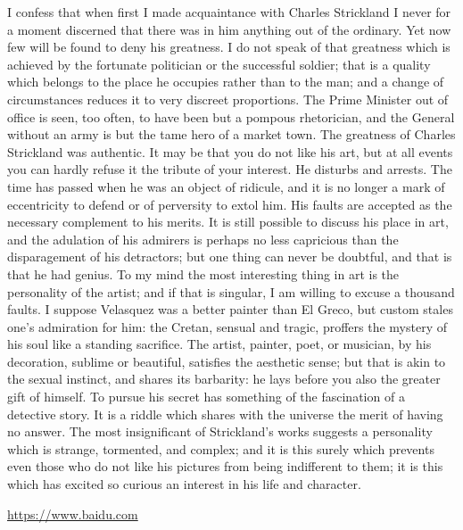 \documentclass{article}
\begin{document}
  I confess that when first I made acquaintance with Charles Strickland I never for a moment discerned that there was in him anything out of the ordinary. Yet now few will be found to deny his greatness. I do not speak of that greatness which is achieved by the fortunate politician or the successful soldier; that is a quality which belongs to the place he occupies rather than to the man; and a change of circumstances reduces it to very discreet proportions. The Prime Minister out of office is seen, too often, to have been but a pompous rhetorician, and the General without an army is but the tame hero of a market town. The greatness of Charles Strickland was authentic. It may be that you do not like his art, but at all events you can hardly refuse it the tribute of your interest. He disturbs and arrests. The time has passed when he was an object of ridicule, and it is no longer a mark of eccentricity to defend or of perversity to extol him. His faults are accepted as the necessary complement to his merits. It is still possible to discuss his place in art, and the adulation of his admirers is perhaps no less capricious than the disparagement of his detractors; but one thing can never be doubtful, and that is that he had genius. To my mind the most interesting thing in art is the personality of the artist; and if that is singular, I am willing to excuse a thousand faults. I suppose Velasquez was a better painter than El Greco, but custom stales one's admiration for him: the Cretan, sensual and tragic, proffers the mystery of his soul like a standing sacrifice. The artist, painter, poet, or musician, by his decoration, sublime or beautiful, satisfies the aesthetic sense; but that is akin to the sexual instinct, and shares its barbarity: he lays before you also the greater gift of himself. To pursue his secret has something of the fascination of a detective story. It is a riddle which shares with the universe the merit of having no answer. The most insignificant of Strickland's works suggests a personality which is strange, tormented, and complex; and it is this surely which prevents even those who do not like his pictures from being indifferent to them; it is this which has excited so curious an interest in his life and character.\par
  \url{https://www.baidu.com}\par
\end{document}
